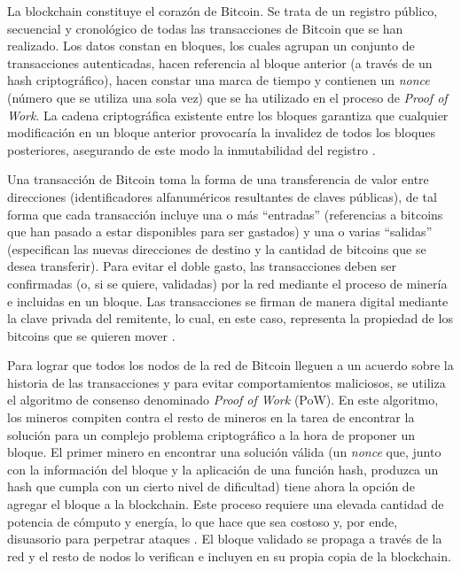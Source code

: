 La blockchain constituye el corazón de Bitcoin. Se trata de un registro público, secuencial y cronológico de todas las transacciones de Bitcoin que se han realizado. Los datos constan en bloques, los cuales agrupan un conjunto de transacciones autenticadas, hacen referencia al bloque anterior (a través de un hash criptográfico), hacen constar una marca de tiempo y contienen un \textit{nonce} (número que se utiliza una sola vez) que se ha utilizado en el proceso de \textit{Proof of Work}. La cadena criptográfica existente entre los bloques garantiza que cualquier modificación en un bloque anterior provocaría la invalidez de todos los bloques posteriores, asegurando de este modo la inmutabilidad del registro \cite{drescher2017blockchain}.

Una transacción de Bitcoin toma la forma de una transferencia de valor entre direcciones (identificadores alfanuméricos resultantes de claves públicas), de tal forma que cada transacción incluye una o más “entradas” (referencias a bitcoins que han pasado a estar disponibles para ser gastados) y una o varias “salidas” (especifican las nuevas direcciones de destino y la cantidad de bitcoins que se desea transferir). Para evitar el doble gasto, las transacciones deben ser confirmadas (o, si se quiere, validadas) por la red mediante el proceso de minería e incluidas en un bloque. Las transacciones se firman de manera digital mediante la clave privada del remitente, lo cual, en este caso, representa la propiedad de los bitcoins que se quieren mover \cite{Antonopoulos2014}.

Para lograr que todos los nodos de la red de Bitcoin lleguen a un acuerdo sobre la historia de las transacciones y para evitar comportamientos maliciosos, se utiliza el algoritmo de consenso denominado \textit{Proof of Work} (PoW). En este algoritmo, los mineros compiten contra el resto de mineros en la tarea de encontrar la solución para un complejo problema criptográfico a la hora de proponer un bloque. El primer minero en encontrar una solución válida (un \textit{nonce} que, junto con la información del bloque y la aplicación de una función hash, produzca un hash que cumpla con un cierto nivel de dificultad) tiene ahora la opción de agregar el bloque a la blockchain. Este proceso requiere una elevada cantidad de potencia de cómputo y energía, lo que hace que sea costoso y, por ende, disuasorio para perpetrar ataques \cite{Buterin2014}. El bloque validado se propaga a través de la red y el resto de nodos lo verifican e incluyen en su propia copia de la blockchain.

